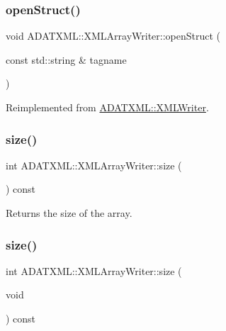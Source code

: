 \subsubsection{\texorpdfstring{openStruct()}{openStruct()}\hspace{0.1cm}{\footnotesize\ttfamily [3/3]}}
{\footnotesize\ttfamily void A\+D\+A\+T\+X\+M\+L\+::\+X\+M\+L\+Array\+Writer\+::open\+Struct (\begin{DoxyParamCaption}\item[{const std\+::string \&}]{tagname }\end{DoxyParamCaption})\hspace{0.3cm}{\ttfamily [virtual]}}



Reimplemented from \mbox{\hyperlink{classADATXML_1_1XMLWriter_a8f9728743acfd9c15ab5d69bf8800a5e}{A\+D\+A\+T\+X\+M\+L\+::\+X\+M\+L\+Writer}}.

\mbox{\label{classADATXML_1_1XMLArrayWriter_a152ffb3695b1f644614a7ca7ca86efa0}} 
\subsubsection{\texorpdfstring{size()}{size()}\hspace{0.1cm}{\footnotesize\ttfamily [1/3]}}
{\footnotesize\ttfamily int A\+D\+A\+T\+X\+M\+L\+::\+X\+M\+L\+Array\+Writer\+::size (\begin{DoxyParamCaption}{ }\end{DoxyParamCaption}) const\hspace{0.3cm}{\ttfamily [inline]}}



Returns the size of the array. 

\mbox{\label{classADATXML_1_1XMLArrayWriter_a152ffb3695b1f644614a7ca7ca86efa0}} 
\subsubsection{\texorpdfstring{size()}{size()}\hspace{0.1cm}{\footnotesize\ttfamily [2/3]}}
{\footnotesize\ttfamily int A\+D\+A\+T\+X\+M\+L\+::\+X\+M\+L\+Array\+Writer\+::size (\begin{DoxyParamCaption}\item[{void}]{ }\end{DoxyParamCaption}) const\hspace{0.3cm}{\ttfamily [inline]}}



